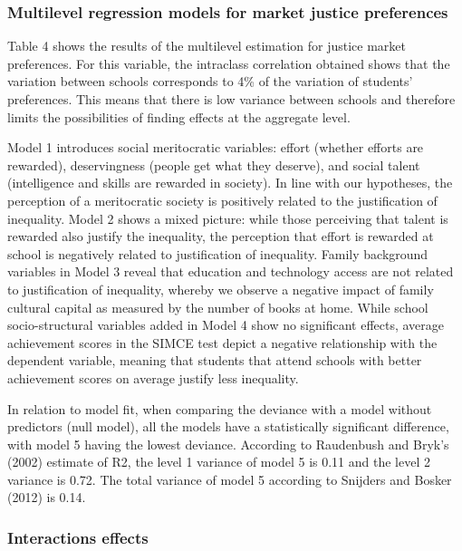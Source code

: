 \documentclass[
  letterpaper,
  DIV=11,
  numbers=noendperiod]{scrartcl}
\begin{document}
\subsubsection{Multilevel regression models for market justice
preferences}\label{multilevel-regression-models-for-market-justice-preferences}

Table 4 shows the results of the multilevel estimation for justice
market preferences. For this variable, the intraclass correlation
obtained shows that the variation between schools corresponds to 4\% of
the variation of students' preferences. This means that there is low
variance between schools and therefore limits the possibilities of
finding effects at the aggregate level.

Model 1 introduces social meritocratic variables: effort (whether
efforts are rewarded), deservingness (people get what they deserve), and
social talent (intelligence and skills are rewarded in society). In line
with our hypotheses, the perception of a meritocratic society is
positively related to the justification of inequality. Model 2 shows a
mixed picture: while those perceiving that talent is rewarded also
justify the inequality, the perception that effort is rewarded at school
is negatively related to justification of inequality. Family background
variables in Model 3 reveal that education and technology access are not
related to justification of inequality, whereby we observe a negative
impact of family cultural capital as measured by the number of books at
home. While school socio-structural variables added in Model 4 show no
significant effects, average achievement scores in the SIMCE test depict
a negative relationship with the dependent variable, meaning that
students that attend schools with better achievement scores on average
justify less inequality.

In relation to model fit, when comparing the deviance with a model
without predictors (null model), all the models have a statistically
significant difference, with model 5 having the lowest deviance.
According to Raudenbush and Bryk's (2002) estimate of R2, the level 1
variance of model 5 is 0.11 and the level 2 variance is 0.72. The total
variance of model 5 according to Snijders and Bosker (2012) is 0.14.

\subsubsection{Interactions effects}\label{interactions-effects}
\end{document}

